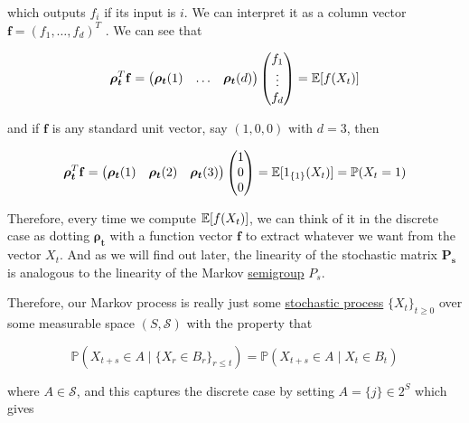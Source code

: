     which outputs $f_i$ if its input is $i$. We can interpret it as a column vector $\mathbf{f} = (f_1, \ldots, f_d)^T$ . We can see that 

      \begin{equation}
        \boldsymbol{\rho_t}^T \mathbf{f} = \begin{pmatrix} \boldsymbol{\rho_t} (1) & \ldots & \boldsymbol{\rho_t} (d) \end{pmatrix} \begin{pmatrix} f_1 \\ \vdots \\ f_d \end{pmatrix} = \operatorname{\mathbb{E}}[f(X_t)]
      \end{equation}

    and if $\mathbf{f}$ is any standard unit vector, say $(1, 0, 0)$ with $d = 3$, then

      \begin{equation}
        \boldsymbol{\rho_t}^T \mathbf{f}  = \begin{pmatrix} \boldsymbol{\rho_t} (1) & \boldsymbol{\rho_t} (2) & \boldsymbol{\rho_t} (3) \end{pmatrix} \begin{pmatrix} 1 \\ 0 \\ 0 \end{pmatrix}= \operatorname{\mathbb{E}}[1_{\{1\}} (X_t)] = \mathbb{P}(X_t = 1)
      \end{equation}

    Therefore, every time we compute $\operatorname{\mathbb{E}}[f(X_t)]$, we can think of it in the discrete case as dotting $\boldsymbol{\rho_t}$ with a function vector $\mathbf{f}$ to extract whatever we want from the vector $X_t$. And as we will find out later, the linearity of the stochastic matrix $\mathbf{P_s}$ is analogous to the linearity of the Markov \hyperref[alg-def:semigroup]{semigroup} $P_s$.  

    Therefore, our Markov process is really just some \hyperref[def:stochastic-process]{stochastic process} $\{X_t\}_{t \geq 0}$ over some measurable space $(S, \mathcal{S})$ with the property that 

      \begin{equation}
        \mathbb{P}(X_{t + s} \in A \mid \{X_r \in B_r\}_{r \leq t}) = \mathbb{P}( X_{t + s} \in A \mid X_t \in B_t)
      \end{equation}

    where $A \in \mathcal{S}$, and this captures the discrete case by setting $A = \{j\} \in 2^S$ which gives 

